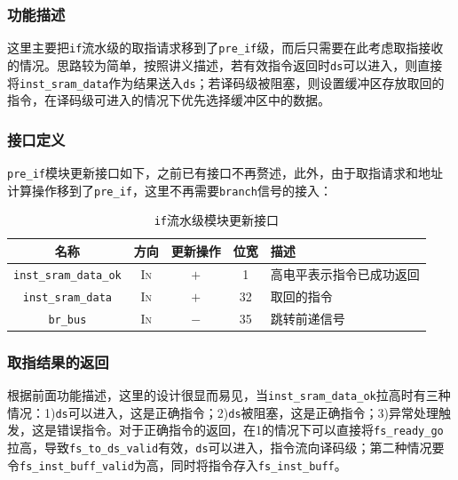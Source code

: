 \documentclass[UTF-8,twoside,c5size]{ctexart}
\begin{document}
	\subsubsection{功能描述}
	
	这里主要把\texttt{if}流水级的取指请求移到了\texttt{pre_if}级，而后只需要在此考虑取指接收的情况。思路较为简单，按照讲义描述，若有效指令返回时\texttt{ds}可以进入，则直接将\texttt{inst_sram_data}作为结果送入\texttt{ds}；若译码级被阻塞，则设置缓冲区存放取回的指令，在译码级可进入的情况下优先选择缓冲区中的数据。
	
	\subsubsection{接口定义}
	
	\texttt{pre_if}模块更新接口如下，之前已有接口不再赘述，此外，由于取指请求和地址计算操作移到了\texttt{pre_if}，这里不再需要\texttt{branch}信号的接入：
	
	\begin{table}[!h]
	\begin{center}
		\caption{\texttt{if}流水级模块更新接口}
		\begin{tabularx}{\textwidth}{|c|c|c|c|Y|}
			\hline
			\textbf{名称} & \textbf{方向} & \textbf{更新操作} & \textbf{位宽} & \textbf{描述} \\
			\hline
			\texttt{inst_sram_data_ok} & \textsc{In} & $+$ & 1 & 高电平表示指令已成功返回 \\
			\hline
			\texttt{inst_sram_data} & \textsc{In} & $+$ & 32 & 取回的指令 \\
			\hline
			\texttt{br_bus} & \textsc{In} & $-$ & 35 & 跳转前递信号 \\
			\hline
		\end{tabularx}
	\end{center}
	\end{table}

	\subsubsection{取指结果的返回}

	根据前面功能描述，这里的设计很显而易见，当\texttt{inst_sram_data_ok}拉高时有三种情况：1)\texttt{ds}可以进入，这是正确指令；2)\texttt{ds}被阻塞，这是正确指令；3)异常处理触发，这是错误指令。对于正确指令的返回，在1的情况下可以直接将\texttt{fs_ready_go}拉高，导致\texttt{fs_to_ds_valid}有效，\texttt{ds}可以进入，指令流向译码级；第二种情况要令\texttt{fs_inst_buff_valid}为高，同时将指令存入\texttt{fs_inst_buff}。
	
\end{document}
